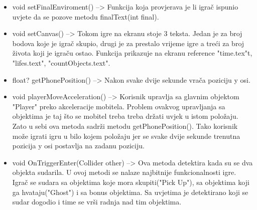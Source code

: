 \begin{itemize}
\item void setFinalEnviroment() --> Funkcija koja provjerava je li igrač ispunio uvjete da se pozove metodu finalText(int final).
 
\item void setCanvas() --> Tokom igre na ekranu stoje 3 teksta. Jedan je za broj bodova koje je igrač skupio, drugi je za prestalo vrijeme igre a treći za broj života koji  je igraču ostao. Funkcija prikazuje na ekranu reference "time.tex"t, "lifes.text", "countObjects.text".

\item float? getPhonePosition() --> Nakon svake dvije sekunde vrača poziciju y osi.

\item void playerMoveAcceleration() --> Korisnik upravlja sa glavnim objektom "Player" preko akceleracije mobitela. Problem ovakvog upravljanja sa objektima je taj što se mobitel treba treba držati uvjek u istom položaju. Zato u sebi ova metoda sadrži metodu getPhonePosition(). Tako korisnik može igrati igru u bilo kojem položaju jer se svake dvije sekunde trenutna pozicija y osi postavlja na zadanu poziciju.

\item void OnTriggerEnter(Collider other) --> Ova metoda detektira kada su se dva objekta sudarila. U ovoj metodi se nalaze najbitnije funkcionalnosti igre. Igrač se sudara sa objektima koje mora skupiti("Pick Up"), sa objektima koji ga hvataju("Ghost") i sa bonus objektima. Sa uvjetima je detektirano koji se sudar dogodio i time se vrši radnja nad tim objektima.

 
\end{itemize}




